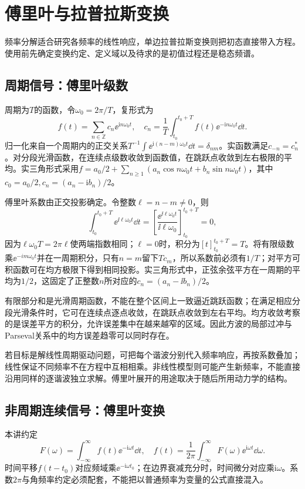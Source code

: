 \section{傅里叶与拉普拉斯变换}\label{sec:c4-transforms}
频率分解适合研究各频率的线性响应，单边拉普拉斯变换则把初态直接带入方程。使用前先确定变换约定、定义域以及待求的是初值过程还是稳态频谱。

\subsection{周期信号：傅里叶级数}
周期为$T$的函数，令$\omega_0=2\pi/T$，复形式为
\[f(t)=\sum_{n\in\mathbb Z}c_n\ee^{\mathrm in\omega_0t},\quad
c_n=\frac1T\int_{t_0}^{t_0+T}f(t)\ee^{-\mathrm in\omega_0t}\dd t.
\]
归一化来自一个周期内的正交关系$T^{-1}\int\ee^{\mathrm i(n-m)\omega_0t}\dd t=\delta_{nm}$。实函数满足$c_{-n}=c_n^*$。对分段光滑函数，在连续点级数收敛到函数值，在跳跃点收敛到左右极限的平均。实三角形式采用$f=a_0/2+\sum_{n\ge1}(a_n\cos n\omega_0t+b_n\sin n\omega_0t)$，其中$c_0=a_0/2,c_n=(a_n-\mathrm ib_n)/2$。

傅里叶系数由正交投影确定。令整数$\ell=n-m\ne0$，则
\[\int_{t_0}^{t_0+T}\ee^{\ii\ell\omega_0t}\dd t
=\left[\frac{\ee^{\ii\ell\omega_0t}}{\ii\ell\omega_0}\right]_{t_0}^{t_0+T}=0,\]
因为$\ell\omega_0T=2\pi\ell$使两端指数相同；$\ell=0$时，积分为$[t]_{t_0}^{t_0+T}=T$。将有限级数乘$\ee^{-im\omega_0t}$并在一周期积分，只有$n=m$留下$Tc_m$，所以系数前必须有$1/T$；对平方可积函数可在均方极限下得到相同投影。实三角形式中，正弦余弦平方在一周期的平均为$1/2$，这固定了正整数$n$所对应的$c_n=(a_n-\ii b_n)/2$。

有限部分和是光滑周期函数，不能在整个区间上一致逼近跳跃函数；在满足相应分段光滑条件时，它可在连续点逐点收敛，在跳跃点收敛到左右平均。均方收敛考察的是误差平方的积分，允许误差集中在越来越窄的区域。因此方波的局部过冲与Parseval关系中的均方误差趋零可以同时存在。

若目标是解线性周期驱动问题，可把每个谐波分别代入频率响应，再按系数叠加；线性保证不同频率不在方程中互相相乘。非线性模型则可能产生新频率，不能直接沿用同样的逐谐波独立求解。傅里叶展开的用途取决于随后所用动力学的结构。

\subsection{非周期连续信号：傅里叶变换}
本讲约定
\[F(\omega)=\int_{-\infty}^\infty f(t)\ee^{-\mathrm i\omega t}\dd t,\quad
f(t)=\frac1{2\pi}\int_{-\infty}^\infty F(\omega)\ee^{\mathrm i\omega t}\dd\omega.
\]
时间平移$f(t-t_0)$对应频域乘$\ee^{-\mathrm i\omega t_0}$；在边界衰减充分时，时间微分对应乘$\mathrm i\omega$。系数$2\pi$与角频率约定必须配套，不能把以普通频率为变量的公式直接混入。

